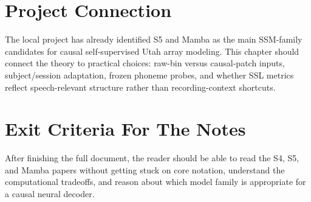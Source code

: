 \section*{Project Connection}

The local project has already identified S5 and Mamba as the main SSM-family candidates
for causal self-supervised Utah array modeling. This chapter should connect the theory to
practical choices: raw-bin versus causal-patch inputs, subject/session adaptation, frozen
phoneme probes, and whether SSL metrics reflect speech-relevant structure rather than
recording-context shortcuts.

\section*{Exit Criteria For The Notes}

After finishing the full document, the reader should be able to read the S4, S5, and
Mamba papers without getting stuck on core notation, understand the computational tradeoffs,
and reason about which model family is appropriate for a causal neural decoder.

